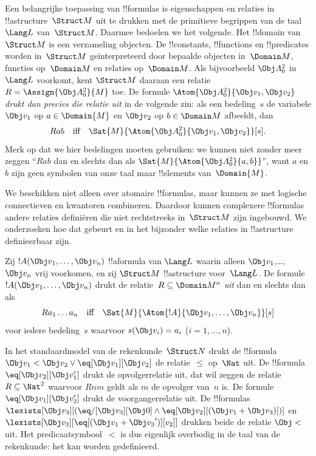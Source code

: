 \documentclass[../../../include/open-logic-section]{subfiles}
\begin{document}


\begin{explain}
Een belangrijke toepassing van !!{formula}s is eigenschappen en
relaties in !!a{structure}~$\Struct M$ uit te drukken met de
primitieve begrippen van de taal~$\Lang L$ van~$\Struct M$. Daarmee
bedoelen we het volgende. Het !!{domain} van $\Struct M$ is een
verzameling objecten. De !!{constant}s, !!{function}s en
!!{predicate}s worden in~$\Struct M$ geïnterpreteerd door bepaalde
objecten in~$\Domain M$, functies op~$\Domain M$ en relaties
op~$\Domain M$. Als bijvoorbeeld $\Obj A^2_0$ in $\Lang L$ voorkomt,
kent $\Struct M$ daaraan een relatie~$R = \Assign{{\Obj
  A^2_0}}{M}$ toe. De formule $\Atom{\Obj A^2_0}{\Obj v_1, \Obj v_2}$
\emph{drukt dan precies die relatie uit} in de volgende zin:
als een bedeling~$s$ de variabele $\Obj v_1$ op $a \in \Domain{M}$ en
$\Obj v_2$ op $b \in \Domain M$ afbeeldt, dan
\[
Rab \text{\quad iff\quad} \Sat{M}{\Atom{\Obj A^2_0}{\Obj v_1, \Obj v_2}}[s].
\]
Merk op dat we hier bedelingen moeten gebruiken: we kunnen niet zonder
meer zeggen ``$Rab$ dan en slechts dan als
$\Sat{M}{\Atom{\Obj A^2_0}{a, b}}$'', want $a$ en $b$ zijn geen
symbolen van onze taal maar !!{element}s van~$\Domain{M}$.

We beschikken niet alleen over atomaire !!{formula}s, maar kunnen ze
met logische connectieven en kwantoren combineren. Daardoor kunnen
complexere !!{formula}s andere relaties definiëren die niet
rechtstreeks in~$\Struct M$ zijn ingebouwd. We onderzoeken hoe dat
gebeurt en in het bijzonder welke relaties in !!a{structure}
definieerbaar zijn.
\end{explain}

\begin{defn}
Zij $!A(\Obj v_1,\dots, \Obj v_n)$ !!a{formula} van $\Lang L$ waarin
alleen $\Obj v_1$,\dots, $\Obj v_n$ vrij voorkomen, en zij $\Struct M$
!!a{structure} voor~$\Lang L$. De formule
$!A(\Obj v_1,\dots, \Obj v_n)$ drukt de relatie~$R \subseteq
\Domain M^n$ \emph{uit} dan en slechts dan als
\[
Ra_1\dots a_n \text{\quad iff\quad} \Sat{M}{\Atom{!A}{\Obj
    v_1,\dots, \Obj v_n}}[s]
\]
voor iedere bedeling~$s$ waarvoor $s(\Obj v_i) = a_i$ ($i = 1,
\dots, n$).
\end{defn}

\begin{ex}
In het standaardmodel van de rekenkunde~$\Struct N$ drukt de
!!{formula} $\Obj v_1 < \Obj v_2 \lor \eq[\Obj v_1][\Obj v_2]$ de
relatie~$\le$ op~$\Nat$ uit. De !!{formula}
$\eq[\Obj v_2][\Obj v_1']$ drukt de opvolgerrelatie uit, dat wil zeggen
de relatie $R \subseteq \Nat^2$ waarvoor $Rnm$ geldt als $m$ de
opvolger van~$n$ is. De formule $\eq[\Obj v_1][\Obj v_2']$ drukt de
voorgangerrelatie uit. De !!{formula}s
$\lexists[\Obj v_3][(\eq/[\Obj v_3][\Obj 0] \land
  \eq[\Obj v_2][(\Obj v_1 + \Obj v_3)])]$ en $\lexists[\Obj
  v_3][\eq[(\Obj v_1 + {\Obj v_3}')][v_2]]$ drukken beide de relatie
$\Obj <$ uit. Het predicaatsymbool~$<$ is dus eigenlijk overbodig in
de taal van de rekenkunde: het kan worden gedefinieerd.
\end{ex}
\end{document}
